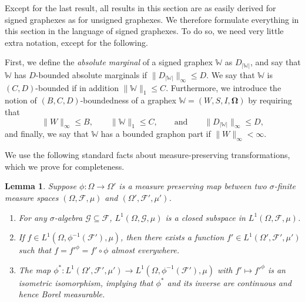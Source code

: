 \documentclass{amsart}
\numberwithin{equation}{section}
\numberwithin{figure}{section}
\newtheorem{lemma}[theorem]{Lemma}
\theoremstyle{definition}
\theoremstyle{remark}
\newcommand{\bOmega}{{\mathbf{\Omega}}}
\newcommand{\cW}{\mathbb{W}}
\newcommand{\cF}{\mathcal{F}}
\newcommand{\cG}{\mathcal{G}}
\begin{document}
Except for the last result, all results in this section are as easily derived
for signed graphexes as for unsigned graphexes. We therefore formulate
everything in this section in the language of signed graphexes. To do so, we
need very little extra notation, except for the following.

First, we define the \emph{absolute marginal} of a signed graphex $\cW$ as
$D_{|\cW|}$, and say that $\cW$ has $D$-bounded absolute marginals if
$\|D_{|\cW|}\|_\infty \le D$. We say that $\cW$ is $(C,D)$-bounded if in
addition $\|\cW\|_1 \le C$. Furthermore, we introduce the notion of
$(B,C,D)$-boundedness of a graphex $\cW=(W,S,I,\bOmega)$ by requiring that
\begin{equation}
\label{BCD-bounded}
\|W\|_\infty\leq B,
\qquad
\|\cW\|_1\leq C,
\qquad\text{and}\qquad
\|D_{|\cW|}\|_\infty\leq D,
\end{equation}
and finally, we say that $\cW$ has a bounded graphon part if
$\|W\|_\infty<\infty$.

We use the following standard facts about measure-preserving transformations,
which we prove for completeness.

\begin{lemma} \label{lemmapullback}
Suppose $\phi\colon \Omega \rightarrow \Omega'$ is a measure preserving map
between two $\sigma$-finite measure spaces $(\Omega, \cF,\mu)$ and $(\Omega',
\cF',\mu')$.
\begin{enumerate}
\item For any $\sigma$-algebra $\cG \subseteq \cF$, $L^1(\Omega,\cG,\mu)$
    is a closed subspace in $L^1(\Omega,\cF,\mu)$.
\item If $f\in L^1(\Omega,\phi^{-1}(\cF'),\mu)$, then there exists a
    function $f'\in L^1(\Omega',\cF',\mu')$ such that $f=f'^{\phi}=f' \circ
\phi$ almost everywhere.
\item The map $\phi^*\colon L^1(\Omega',\cF',\mu') \rightarrow
    L^1(\Omega,\phi^{-1}(\cF'),\mu)$ with $f'\mapsto {f'}^\phi$ is an
isometric isomorphism, implying that $\phi^*$ and its inverse are
continuous and hence Borel measurable.
\end{enumerate}
\end{lemma}
\end{document}
